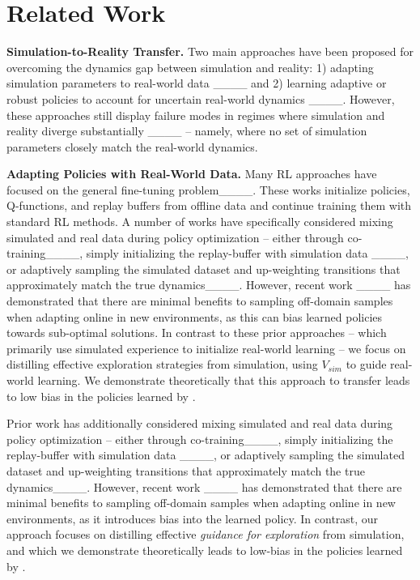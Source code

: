 \section{Related Work}
\label{sec:related}
\noindent\textbf{Simulation-to-Reality Transfer.} Two main approaches have been proposed for overcoming the dynamics gap between simulation and reality:  1) adapting simulation parameters to real-world data ____ and 2) learning adaptive or robust policies to account for uncertain real-world dynamics ____. However, these approaches still display failure modes in regimes where simulation and reality diverge substantially ____ -- namely, where no set of simulation parameters closely match the real-world dynamics. 


\noindent\textbf{Adapting Policies with Real-World Data.} 
Many RL approaches have focused on the general fine-tuning problem____. These works initialize policies, Q-functions, and replay buffers from offline data and continue training them with standard RL methods. A number of works have specifically considered mixing simulated and real data during policy optimization -- either through co-training____, simply initializing the replay-buffer with simulation data ____, or adaptively sampling the simulated dataset and up-weighting transitions that approximately match the true dynamics____. However, recent work ____ has demonstrated that there are minimal benefits to sampling off-domain samples when adapting online in new environments, as this can bias learned policies towards sub-optimal solutions. In contrast to these prior approaches -- which primarily use simulated experience to initialize real-world learning -- we focus on distilling effective exploration strategies from simulation, using $V_{sim}$ to guide real-world learning. We demonstrate theoretically that this approach to transfer leads to low bias in the policies learned by \Method. 
\begin{comment}
. While going back from the real world to simulation can help target the simulation parameters more accurately____, it cannot overcome inherent model misspecification, as we show in our experimental evaluation. Learning adaptive policies to account for changing real-world dynamics____ can help to some extent but is unable to guide exploration and adapt beyond the training dynamics range.\end{comment} Prior work has additionally considered mixing simulated and real data during policy optimization -- either through co-training____, simply initializing the replay-buffer with simulation data ____, or adaptively sampling the simulated dataset and up-weighting transitions that approximately match the true dynamics____. However, recent work ____ has demonstrated that there are minimal benefits to sampling off-domain samples when adapting online in new environments, as it introduces bias into the learned policy.  In contrast, our approach focuses on distilling effective \emph{guidance for exploration} from simulation, and which we demonstrate theoretically leads to low-bias in the policies learned by \Method . 

